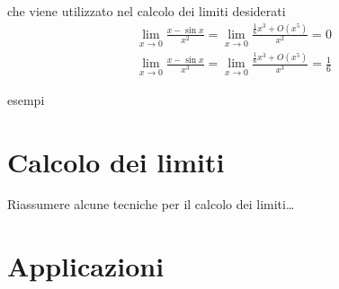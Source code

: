 \documentclass[letterpaper,10pt,italian]{jupyterBook}
\begin{document}
\begin{itemize}
\begin{equation*}
\end{equation*}
\sphinxAtStartPar
che viene utilizzato nel calcolo dei limiti desiderati
\begin{equation*}
\begin{split}\lim_{x \rightarrow 0} \frac{x - \sin x}{x^2} = \lim_{x \rightarrow 0} \frac{\frac{1}{6} x^3 + O(x^5)}{x^2} = 0 \end{split}
\end{equation*}\begin{equation*}
\begin{split}\lim_{x \rightarrow 0} \frac{x - \sin x}{x^3} = \lim_{x \rightarrow 0} \frac{\frac{1}{6} x^3 + O(x^5)}{x^3} = \frac{1}{6} \end{split}
\end{equation*}
\end{itemize}

\sphinxAtStartPar
{} esempi


\section{Calcolo dei limiti}
\label{\detokenize{ch/infinitesimal_calculus/analysis:calcolo-dei-limiti}}\label{\detokenize{ch/infinitesimal_calculus/analysis:infinitesimal-calculus-limits-eval}}
\sphinxAtStartPar
{} Riassumere alcune tecniche per il calcolo dei limiti…


\section{Applicazioni}
\label{\detokenize{ch/infinitesimal_calculus/analysis:applicazioni}}\label{\detokenize{ch/infinitesimal_calculus/analysis:infinitesimal-calculus-analysis-applications}}
\end{document}
